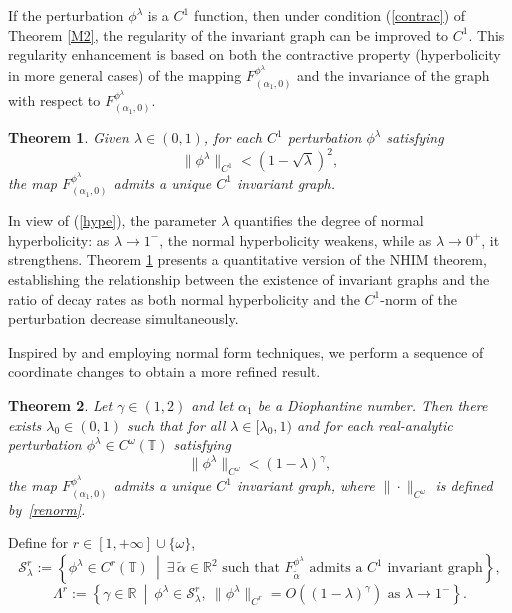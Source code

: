 \documentclass{amsart}
\newcommand{\al}{\alpha}
\newtheorem{Theorem}{Theorem}
\theoremstyle{definition}
\begin{document}
If the perturbation $\phi^\lambda$ is a $C^1$ function, then under condition (\ref{contrac}) of Theorem \ref{M2},  the regularity of the invariant graph can be improved to $C^1$. This regularity enhancement is based on both the contractive property (hyperbolicity in more general cases) of the mapping $F^{\phi^\lambda}_{(\al_1,0)}$ and the invariance of the graph with respect to $F^{\phi^\lambda}_{(\al_1,0)}$.





\begin{Theorem}\label{M22}
Given $\lambda \in (0,1)$, for each $C^1$ perturbation $\phi^\lambda$ satisfying
\[
\|\phi^\lambda\|_{C^1} < (1-\sqrt{\lambda})^2,
\]
the map $F^{\phi^\lambda}_{(\al_1,0)}$ admits a unique $C^1$ invariant graph.
\end{Theorem}


In view of (\ref{hype}), the parameter $\lambda$ quantifies the degree of normal hyperbolicity: as $\lambda \to 1^-$, the normal hyperbolicity weakens, while as $\lambda \to 0^+$, it strengthens.
Theorem \ref{M22} presents a quantitative version of the NHIM theorem, establishing the relationship between the existence of invariant graphs and the ratio of decay rates as both normal hyperbolicity and the $C^1$-norm of the perturbation  decrease simultaneously.

 \vspace{1em}

Inspired by \cite{Ma} and employing normal form techniques, we perform a sequence of coordinate changes to obtain a more refined result.


\begin{Theorem}\label{M222}
Let $\gamma \in (1,2)$ and let $\alpha_1$ be a Diophantine number. Then there exists $\lambda_0 \in (0,1)$ such that for all $\lambda \in [\lambda_0, 1)$ and for each real-analytic perturbation $\phi^\lambda \in C^\omega(\mathbb{T})$ satisfying
\[
\|\phi^\lambda\|_{C^\omega} < (1 - \lambda)^{\gamma},
\]
the map $F^{\phi^\lambda}_{(\alpha_1, 0)}$ admits a unique $C^1$ invariant graph, where $\|\cdot\|_{C^\omega}$ is defined by~\eqref{renorm}.
\end{Theorem}

Define for $r\in [1,+\infty]\cup\{\omega\}$,
\[
\mathcal{S}^r_\lambda := \left\{ \phi^\lambda \in C^r(\mathbb{T})\ \middle|\ \exists\, \tilde{\alpha} \in \mathbb{R}^2 \text{ such that } F^{\phi^\lambda}_{\tilde{\alpha}} \text{ admits a } C^1 \text{ invariant graph} \right\},
\]
\[
\Lambda^r:= \left\{ \gamma \in \mathbb{R}\ \middle|\ \phi^\lambda \in \mathcal{S}^r_\lambda,\ \|\phi^\lambda\|_{C^r} = O((1 - \lambda)^{\gamma}) \text{ as } \lambda \to 1^- \right\}.
\]
\end{document}
